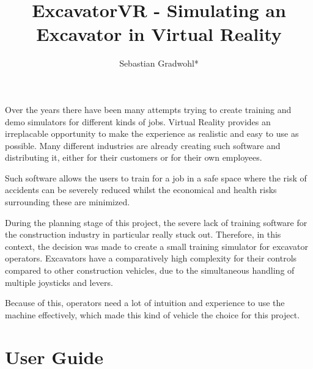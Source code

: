 \documentclass[journal]{vgtc}                     %
\title{ExcavatorVR - Simulating an Excavator in Virtual Reality}
\author{%
  Sebastian Gradwohl*
}
\begin{document}


\maketitle


Over the years there have been many attempts trying to create training and demo simulators for different kinds of jobs. Virtual Reality provides an irreplacable opportunity to make the experience as realistic and easy to use as possible.
Many different industries are already creating such software and distributing it, either for their customers or for their own employees. 

Such software allows the users to train for a  job in a safe space where the risk of accidents can be severely reduced whilst the economical and health risks surrounding these are minimized.

During the planning stage of this project, the severe lack of training software for the construction industry in particular really stuck out. 
Therefore, in this context, the decision was made to create a small training simulator for excavator operators. Excavators have a comparatively high complexity for their controls compared to other construction vehicles, due to the simultaneous handling of multiple joysticks and levers. 

Because of this, operators need a lot of intuition and experience to use the machine effectively, which made this kind of vehicle the choice for this project.

\section{User Guide}
\end{document}
